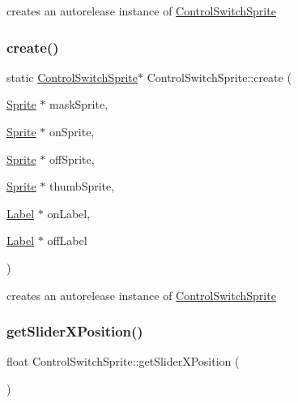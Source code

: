 creates an autorelease instance of \hyperlink{classControlSwitchSprite}{Control\+Switch\+Sprite} \mbox{\label{classControlSwitchSprite_a1509090ace452e9b761a07294fa22a3e}} 
\subsubsection{\texorpdfstring{create()}{create()}\hspace{0.1cm}{\footnotesize\ttfamily [2/2]}}
{\footnotesize\ttfamily static \hyperlink{classControlSwitchSprite}{Control\+Switch\+Sprite}$\ast$ Control\+Switch\+Sprite\+::create (\begin{DoxyParamCaption}\item[{\hyperlink{classSprite}{Sprite} $\ast$}]{mask\+Sprite,  }\item[{\hyperlink{classSprite}{Sprite} $\ast$}]{on\+Sprite,  }\item[{\hyperlink{classSprite}{Sprite} $\ast$}]{off\+Sprite,  }\item[{\hyperlink{classSprite}{Sprite} $\ast$}]{thumb\+Sprite,  }\item[{\hyperlink{classLabel}{Label} $\ast$}]{on\+Label,  }\item[{\hyperlink{classLabel}{Label} $\ast$}]{off\+Label }\end{DoxyParamCaption})\hspace{0.3cm}{\ttfamily [static]}}

creates an autorelease instance of \hyperlink{classControlSwitchSprite}{Control\+Switch\+Sprite} \mbox{\label{classControlSwitchSprite_a7c9434c61807a59e6ac34dbb2e7e840c}} 
\subsubsection{\texorpdfstring{get\+Slider\+X\+Position()}{getSliderXPosition()}\hspace{0.1cm}{\footnotesize\ttfamily [1/2]}}
{\footnotesize\ttfamily float Control\+Switch\+Sprite\+::get\+Slider\+X\+Position (\begin{DoxyParamCaption}{ }\end{DoxyParamCaption})\hspace{0.3cm}{\ttfamily [inline]}}

